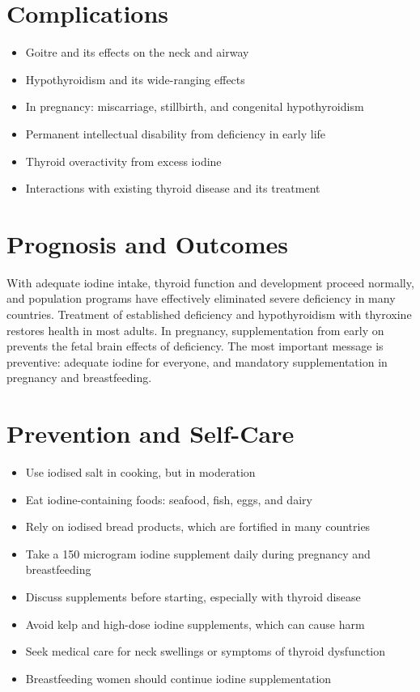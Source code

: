 \section*{Complications}
\begin{itemize}
    \item Goitre and its effects on the neck and airway
    \item Hypothyroidism and its wide-ranging effects
    \item In pregnancy: miscarriage, stillbirth, and congenital hypothyroidism
    \item Permanent intellectual disability from deficiency in early life
    \item Thyroid overactivity from excess iodine
    \item Interactions with existing thyroid disease and its treatment
\end{itemize}

\section*{Prognosis and Outcomes}
With adequate iodine intake, thyroid function and development proceed normally, and population programs have effectively eliminated severe deficiency in many countries. Treatment of established deficiency and hypothyroidism with thyroxine restores health in most adults. In pregnancy, supplementation from early on prevents the fetal brain effects of deficiency. The most important message is preventive: adequate iodine for everyone, and mandatory supplementation in pregnancy and breastfeeding.

\section*{Prevention and Self-Care}
\begin{itemize}
    \item Use iodised salt in cooking, but in moderation
    \item Eat iodine-containing foods: seafood, fish, eggs, and dairy
    \item Rely on iodised bread products, which are fortified in many countries
    \item Take a 150 microgram iodine supplement daily during pregnancy and breastfeeding
    \item Discuss supplements before starting, especially with thyroid disease
    \item Avoid kelp and high-dose iodine supplements, which can cause harm
    \item Seek medical care for neck swellings or symptoms of thyroid dysfunction
    \item Breastfeeding women should continue iodine supplementation
\end{itemize}

